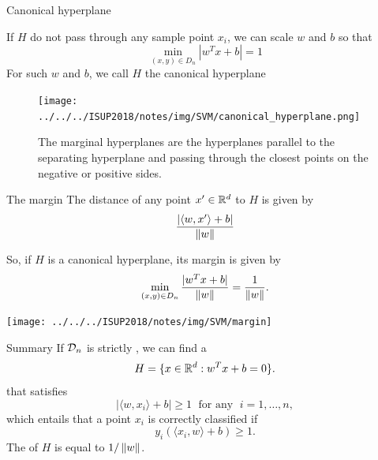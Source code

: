 \documentclass[xcolor={usenames,dvipsnames}]{beamer}
\begin{document}
\begin{frame}{Canonical hyperplane}

  If $H$ do not pass through any sample point $x_i$, we can scale $w$ and $b$ so that
  \begin{equation*}
    \min_{(x, y) \in D_n} |w^T x + b| = 1
  \end{equation*}
    For such $w$ and $b$, we call $H$ the {\color{Vert}canonical} hyperplane
    
    
  \begin{figure}
  \begin{center}
    \texttt{[image: ../../../ISUP2018/notes/img/SVM/canonical\_hyperplane.png]}
    \caption{The marginal hyperplanes are the hyperplanes parallel to the separating hyperplane and passing through the closest points on the negative or positive sides.}
  \end{center}
  \end{figure}


\end{frame}


\begin{frame}{The margin}
  The distance of any point $x' \in \mathbb{R}^d$ to $H$ is given by
  \begin{equation*}
    \frac{|\langle {w, x'} \rangle  + b|}{\left\| w \right\|}
  \end{equation*}

\begin{exampleblock}{}
  So, if $H$ is a canonical hyperplane, its {\color{Vert}margin} is given by
  \begin{equation*}
    \min_{(x, y) \in D_n}   \frac{|w^T x + b|}{\left\| w \right\|} 
    = \frac{1}{\left\| w \right\|}.
  \end{equation*}
 \end{exampleblock}

  \begin{center}
    \texttt{[image: ../../../ISUP2018/notes/img/SVM/margin]}
  \end{center}

\end{frame}



\begin{frame}{Summary}
If ${\mathcal{D}}_n$ is strictly , we can find a  
\begin{equation*}
  H = \{ x \in \mathbb{R}^d : w^T x + b = 0 \}.
\end{equation*}
that satisfies
\begin{equation*}
  |\langle {w, x_i} \rangle  + b| \geq 1 \; \text{ for any } \; i=1, \ldots, n,
\end{equation*}
which entails that a point $x_i$ is correctly classified if
\begin{equation*}
  y_i (\langle {x_i, w} \rangle  + b) \geq 1.
\end{equation*}
The  of $H$ is equal to $1 / \left\| w \right\|$.
\end{frame}
\end{document}
